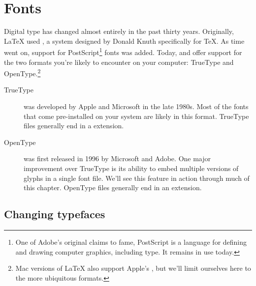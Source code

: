 \chapter{Fonts}
\label{fonts}

Digital type has changed almost entirely in the past thirty years.
Originally, \LaTeX{} used \MF,
a system designed by Donald Knuth specifically for \TeX{}.
As time went on, support for PostScript\footnote{One of
Adobe's original claims to fame,
PostScript is a language for defining and drawing computer graphics,
including type. It remains in use today.} fonts was added.
Today, \LuaLaTeX{} and \XeLaTeX{} offer support for the two formats you're
likely to encounter on your computer:
TrueType and OpenType.\punckern\footnote{Mac versions of \LaTeX{} also support
Apple's , but we'll limit ourselves here to the more ubiquitous
formats.}

\begin{description}
\item[TrueType] was developed by Apple and Microsoft in the late 1980s.
    Most of the fonts that come pre-installed on your system are likely
    in this format.
    TrueType files generally end in a  extension.
\item[OpenType] was first released in 1996 by Microsoft and Adobe.
    One major improvement over TrueType is its ability to embed
    multiple versions of glyphs in a single font file.
    We'll see this feature in action through much of this chapter.
    OpenType files generally end in an  extension.
\end{description}

\section{Changing typefaces}

